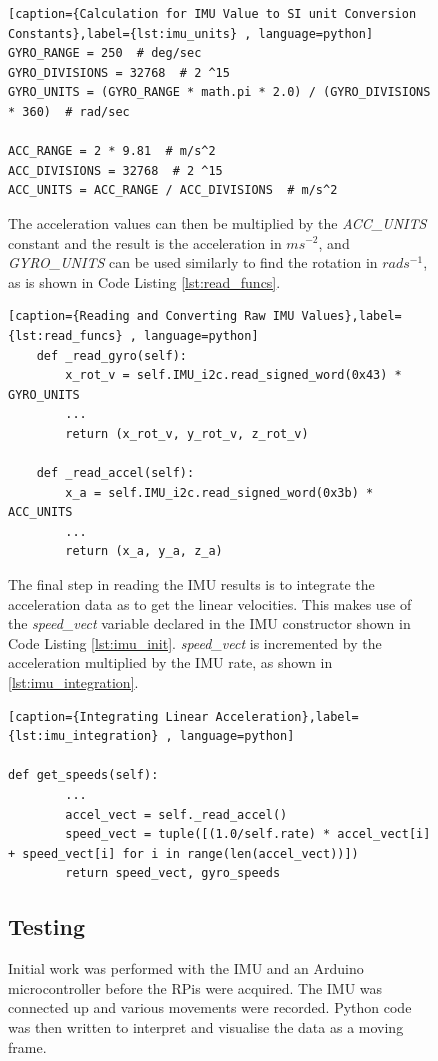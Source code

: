 \begin{figure}[!ht]
\begin{lstlisting}[caption={Calculation for IMU Value to SI unit Conversion Constants},label={lst:imu_units} , language=python]
GYRO_RANGE = 250  # deg/sec
GYRO_DIVISIONS = 32768  # 2 ^15
GYRO_UNITS = (GYRO_RANGE * math.pi * 2.0) / (GYRO_DIVISIONS * 360)  # rad/sec

ACC_RANGE = 2 * 9.81  # m/s^2
ACC_DIVISIONS = 32768  # 2 ^15
ACC_UNITS = ACC_RANGE / ACC_DIVISIONS  # m/s^2
\end{lstlisting}

The acceleration values can then be multiplied by the \textit{ACC\_UNITS} constant and the result is the acceleration in $ms^{-2}$, and \textit{GYRO\_UNITS} can be used similarly to find the rotation in $rads^{-1}$, as is shown in Code Listing \ref{lst:read_funcs}. 


\begin{lstlisting}[caption={Reading and Converting Raw IMU Values},label={lst:read_funcs} , language=python]
    def _read_gyro(self):
        x_rot_v = self.IMU_i2c.read_signed_word(0x43) * GYRO_UNITS
		...
        return (x_rot_v, y_rot_v, z_rot_v)

    def _read_accel(self):
        x_a = self.IMU_i2c.read_signed_word(0x3b) * ACC_UNITS
		...
        return (x_a, y_a, z_a)
\end{lstlisting}

The final step in reading the IMU results is to integrate the acceleration data as to get the linear velocities. This makes use of the \textit{speed\_vect} variable declared in the IMU constructor shown in Code Listing \ref{lst:imu_init}. \textit{speed\_vect} is incremented by the acceleration multiplied by the IMU rate, as shown in \ref{lst:imu_integration}.

\begin{lstlisting}[caption={Integrating Linear Acceleration},label={lst:imu_integration} , language=python]

def get_speeds(self):
		...
        accel_vect = self._read_accel()
        speed_vect = tuple([(1.0/self.rate) * accel_vect[i] + speed_vect[i] for i in range(len(accel_vect))])
        return speed_vect, gyro_speeds
\end{lstlisting}


\subsection{Testing}\label{elec/imu/test}
Initial work was performed with the IMU and an Arduino microcontroller before the RPis were acquired. The IMU was connected up and various movements were recorded. Python code was then written to interpret and visualise the data as a moving frame. 


\end{figure}
